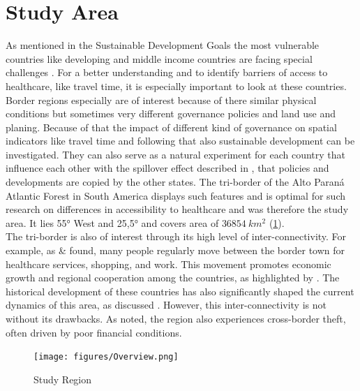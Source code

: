 \documentclass[11pt, a4paper]{report}
\begin{document}
\section{Study Area}\label{sec:introstudyarea}
As mentioned in the Sustainable Development Goals the most vulnerable countries like developing and middle income countries are facing special challenges \citet{united_nations_transforming_2015}. For a better understanding and to identify barriers of access to healthcare, like travel time, it is especially important to look at these countries. \\
%
Border regions especially are of interest because of there similar physical conditions but sometimes very different governance policies and land use and planing. Because of that the impact of different kind of governance on spatial indicators like travel time and following that also sustainable development can be investigated. They can also serve as a natural experiment for each country that influence each other with the spillover effect described in \citet{piquer-rodriguez_land_2021}, that policies and developments are copied by the other states. The tri-border of the Alto Paraná Atlantic Forest in South America displays such features and is optimal for such research on differences in accessibility to healthcare and was therefore the study area. It lies 55° West and 25,5° and covers area of  $36854 \ km^2$ (\ref{fig:studyregion}). \\
%
The tri-border is also of interest through its high level of inter-connectivity. For example, as \citet{marques_circularidad_2013} \& \citet{cardelli_caso_2021} found, many people regularly move between the border town for healthcare services, shopping, and work. This movement promotes economic growth and regional cooperation among the countries, as highlighted by \citet{arsentyeva_triple_2020}. The historical development of these countries has also significantly shaped the current dynamics of this area, as discussed \citet{lisboa_path_2021}. However, this inter-connectivity is not without its drawbacks. As \citet{martens_ilegalismos_2019} noted, the region also experiences cross-border theft, often driven by poor financial conditions.

\begin{figure}
  \centering
  \texttt{[image: figures/Overview.png]}
  \caption{Study Region}
  \label{fig:studyregion}
\end{figure}
\end{document}
